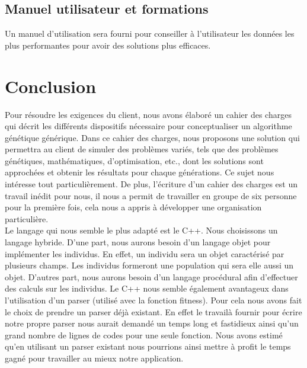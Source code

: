 \documentclass[a4paper,11pt]{article}
\begin{document}
		\subsection{Manuel utilisateur et formations}
		Un manuel d'utilisation sera fourni pour conseiller à l’utilisateur les données les plus performantes pour avoir des solutions plus efficaces.
	
	\section{Conclusion}
		Pour résoudre les exigences du client, nous avons élaboré un cahier des charges qui décrit les différents dispositifs nécessaire pour conceptualiser un algorithme génétique générique. Dans ce cahier des charges, nous proposons une solution qui permettra au client de simuler des problèmes variés, tels que des problèmes génétiques, mathématiques, d’optimisation, etc., dont les solutions sont approchées et obtenir les résultats pour chaque générations. 
		Ce sujet nous intéresse tout particulièrement. De plus, l’écriture d’un cahier des charges est un travail inédit pour nous, il nous a permit de travailler en groupe de six personne pour la première fois, cela nous a appris à développer une organisation particulière.\\
		Le langage qui nous semble le plus adapté est le C++. Nous choisissons un langage hybride. D’une part, nous aurons besoin d’un langage objet pour implémenter les individus. En effet, un individu sera un objet caractérisé par plusieurs champs. Les individus formeront une population qui sera elle aussi un objet. 
		D’autres part, nous aurons besoin d’un langage procédural afin d’effectuer des calculs sur les individus. Le C++ nous semble également avantageux dans l’utilisation d’un parser (utilisé avec la fonction fitness).
		Pour cela nous avons fait le choix de prendre un parser déjà existant. En effet le travailà fournir pour écrire notre propre parser nous aurait demandé un temps long et fastidieux ainsi qu'un grand nombre de lignes de codes pour une seule fonction. Nous avons estimé qu'en utilisant un parser existant nous pourrions ainsi mettre à profit le temps gagné pour travailler au mieux notre application.
	
\end{document}

